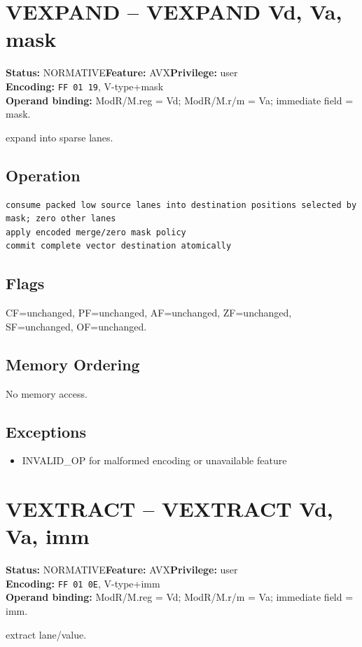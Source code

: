 \documentclass[10pt]{article}
\begin{document}
\section{VEXPAND -- VEXPAND Vd, Va, mask}
\textbf{Status:} NORMATIVE\quad \textbf{Feature:} AVX\quad \textbf{Privilege:} user\\
\textbf{Encoding:} \texttt{FF 01 19}, V-type+mask\\
\textbf{Operand binding:} ModR/M.reg = Vd; ModR/M.r/m = Va; immediate field = mask.

expand into sparse lanes.

\subsection*{Operation}
\begin{lstlisting}
consume packed low source lanes into destination positions selected by mask; zero other lanes
apply encoded merge/zero mask policy
commit complete vector destination atomically
\end{lstlisting}
\subsection*{Flags}
CF=unchanged, PF=unchanged, AF=unchanged, ZF=unchanged, SF=unchanged, OF=unchanged.
\subsection*{Memory Ordering}
No memory access.
\subsection*{Exceptions}
\begin{itemize}
\item INVALID\_OP for malformed encoding or unavailable feature
\end{itemize}
\clearpage

\section{VEXTRACT -- VEXTRACT Vd, Va, imm}
\textbf{Status:} NORMATIVE\quad \textbf{Feature:} AVX\quad \textbf{Privilege:} user\\
\textbf{Encoding:} \texttt{FF 01 0E}, V-type+imm\\
\textbf{Operand binding:} ModR/M.reg = Vd; ModR/M.r/m = Va; immediate field = imm.

extract lane/value.
\end{document}
